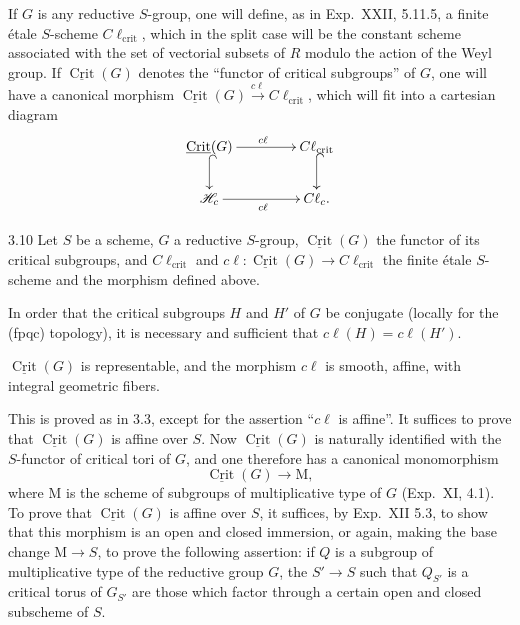 If $G$ is any reductive $S$-group, one will define, as in Exp.~XXII, 5.11.5, a finite \'etale $S$-scheme $C\ell_{\mathrm{crit}}$, which in the split case will be the constant scheme associated with the set of vectorial subsets of $R$ modulo the action of the Weyl group. If $\underline{\operatorname{Crit}}(G)$ denotes the ``functor of critical subgroups'' of $G$, one will have a canonical morphism $\underline{\operatorname{Crit}}(G)\xrightarrow{c\ell}C\ell_{\mathrm{crit}}$, which will fit into a cartesian diagram
\[
\xymatrix@C=42pt@R=22pt{
\underline{\operatorname{Crit}}(G)\ar[r]^{c\ell}\ar@{^{(}->}[d]&C\ell_{\mathrm{crit}}\ar@{^{(}->}[d]\\
\mathscr H_c\ar[r]_{c\ell}&C\ell_c.
}
\]
\begin{proposition}{3.10}\label{XXVI.3.10}
Let $S$ be a scheme, $G$ a reductive $S$-group, $\underline{\operatorname{Crit}}(G)$ the functor of its critical subgroups, and $C\ell_{\mathrm{crit}}$ and $c\ell:\underline{\operatorname{Crit}}(G)\to C\ell_{\mathrm{crit}}$ the finite \'etale $S$-scheme and the morphism defined above.
\begin{enumeratei}
\item In order that the critical subgroups $H$ and $H'$ of $G$ be conjugate (locally for the (fpqc) topology), it is necessary and sufficient that $c\ell(H)=c\ell(H')$.
\item $\underline{\operatorname{Crit}}(G)$ is representable, and the morphism $c\ell$ is smooth, affine, with integral geometric fibers.
\end{enumeratei}
\end{proposition}
This is proved as in 3.3, except for the assertion ``$c\ell$ is affine''. It suffices to prove that $\underline{\operatorname{Crit}}(G)$ is affine over $S$. Now $\underline{\operatorname{Crit}}(G)$ is naturally identified with the $S$-functor of critical tori of $G$, and one therefore has a canonical monomorphism
\[
\underline{\operatorname{Crit}}(G)\to\mathrm M,
\]
where $\mathrm M$ is the scheme of subgroups of multiplicative type of $G$ (Exp.~XI, 4.1). To prove that $\underline{\operatorname{Crit}}(G)$ is affine over $S$, it suffices, by Exp.~XII 5.3, to show that this morphism is an open and closed immersion, or again, making the base change $\mathrm M\to S$, to prove the following assertion: if $Q$ is a subgroup of multiplicative type of the reductive group $G$, the $S'\to S$ such that $Q_{S'}$ is a critical torus of $G_{S'}$ are those which factor through a certain open and closed subscheme of $S$.

